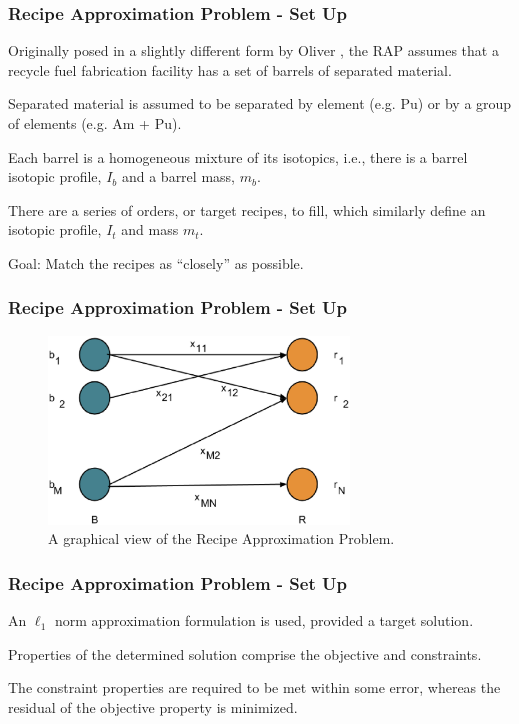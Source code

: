 \begin{frame}[ctb!]
  \frametitle{Recipe Approximation Problem - Set Up} 

  Originally posed in a slightly different form by Oliver
  \cite{oliver_geniusv2:_2009}, the RAP assumes that a recycle fuel fabrication
  facility has a set of barrels of separated material.\vspace{0.2cm}

  Separated material is assumed to be separated by element (e.g. Pu) or by a
  group of elements (e.g. Am + Pu).\vspace{0.2cm}

  Each barrel is a homogeneous mixture of its isotopics, i.e., there is a barrel
  isotopic profile, $I_b$ and a barrel mass, $m_b$.\vspace{0.2cm}

  There are a series of orders, or target recipes, to fill, which similarly
  define an isotopic profile, $I_t$ and mass $m_t$.\vspace{0.2cm}

  Goal: Match the recipes as ``closely'' as possible.
\end{frame}

\begin{frame}[ctb!]
  \frametitle{Recipe Approximation Problem - Set Up} 
    \begin{figure}
    \includegraphics[height=5cm]{./images/rap.eps}
    \caption{A graphical view of the Recipe Approximation Problem.}
  \end{figure}
\end{frame}

\begin{frame}[ctb!]
  \frametitle{Recipe Approximation Problem - Set Up} 

  An $\ell_1$ norm approximation formulation is used, provided a target
  solution.\vspace{0.2cm}
  
  Properties of the determined solution comprise the objective and
  constraints.\vspace{0.2cm}

  The constraint properties are required to be met within some error, whereas
  the residual of the objective property is minimized.
\end{frame}

